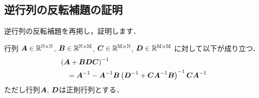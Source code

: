 %

\subsection{逆行列の反転補題の証明}

逆行列の反転補題を再掲し，証明します．

\begin{theorem}[逆行列の反転補題]
    行列
    $\boldsymbol{A} \in \mathbb{R^{N \times N}}$,
    $\boldsymbol{B} \in \mathbb{R^{N \times M}}$,
    $\boldsymbol{C} \in \mathbb{R^{M \times N}}$,
    $\boldsymbol{D} \in \mathbb{R^{M \times M}}$
    に対して以下が成り立つ．
    \begin{align*}
        &\left( \boldsymbol{A} + \boldsymbol{BDC} \right)^{-1} \\
        &\hspace{10pt}
        = \boldsymbol{A}^{-1} - \boldsymbol{A}^{-1} \boldsymbol{B} \left( \boldsymbol{D}^{-1} + \boldsymbol{CA}^{-1} \boldsymbol{B} \right)^{-1} \boldsymbol{CA}^{-1}
    \end{align*}
    ただし行列$\boldsymbol{A}$, $\boldsymbol{D}$は正則行列とする．
\end{theorem}
